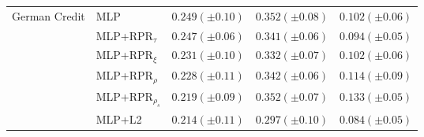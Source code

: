 \begin{tabular}{lllll}
\multirow[t]{6}{*}{German Credit} & MLP & $0.249 (\pm0.10)$ & $0.352 (\pm0.08)$ & $0.102 (\pm0.06)$ \\
 & MLP+RPR$_{\tau}$ & $0.247 (\pm0.06)$ & $0.341 (\pm0.06)$ & $0.094 (\pm0.05)$ \\
 & MLP+RPR$_{\xi}$ & $0.231 (\pm0.10)$ & $0.332 (\pm0.07)$ & $0.102 (\pm0.06)$ \\
 & MLP+RPR$_{\rho}$ & $0.228 (\pm0.11)$ & $0.342 (\pm0.06)$ & $0.114 (\pm0.09)$ \\
 & MLP+RPR$_{\rho_s}$ & $0.219 (\pm0.09)$ & $0.352 (\pm0.07)$ & $0.133 (\pm0.05)$ \\
 & MLP+L2 & $0.214 (\pm0.11)$ & $0.297 (\pm0.10)$ & $0.084 (\pm0.05)$ \\
\cline{1-5}
\bottomrule
\end{tabular}
